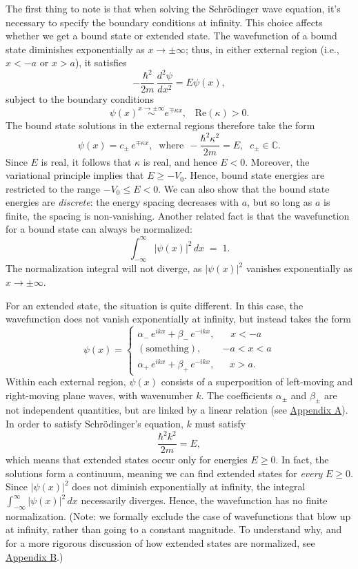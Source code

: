 \documentclass[pra,12pt]{revtex4}
\begin{document}
The first thing to note is that when solving the Schr\"odinger wave
equation, it's necessary to specify the boundary conditions at
infinity.  This choice affects whether we get a bound state or
extended state.  The wavefunction of a bound state diminishes
exponentially as $x \rightarrow \pm\infty$; thus, in either external
region (i.e., $x < -a$ or $x > a$), it satisfies
$$-\frac{\hbar^2}{2m}\,\frac{d^2\psi}{dx^2} = E \psi(x),$$
subject to the boundary conditions
$$\psi(x) \overset{x\rightarrow\pm\infty}{\sim} e^{\mp\kappa x}, \;\;\;\mathrm{Re}(\kappa) > 0.$$
The bound state solutions in the external regions therefore take the
form
$$\psi(x) = c_\pm\, e^{\mp\kappa x}, \;\;\mathrm{where}\;\, -\frac{\hbar^2\kappa^2}{2m} = E, \;\; c_\pm \in \mathbb{C}.$$
Since $E$ is real, it follows that $\kappa$ is real, and hence $E <
0$.  Moreover, the variational principle implies that $E \ge -V_0$.
Hence, bound state energies are restricted to the range $-V_0 \le E <
0$.  We can also show that the bound state energies are
\textit{discrete}: the energy spacing decreases with $a$, but so long
as $a$ is finite, the spacing is non-vanishing.  Another related
fact is that the wavefunction for a bound state can always be
normalized:
$$\int_{-\infty}^\infty |\psi(x)|^2\, dx\; =\; 1.$$
The normalization integral will not diverge, as $|\psi(x)|^2$ vanishes
exponentially as $x \rightarrow \pm \infty$.

For an extended state, the situation is quite different.  In this
case, the wavefunction does not vanish exponentially at infinity, but
instead takes the form
$$\psi(x) = \begin{cases} \alpha_-\, e^{ik x} + \beta_-\, e^{-ik x}, & \;\;\;x < -a\\ (\mathrm{something}) , & -a < x < a\\ \alpha_+\, e^{ik x} + \beta_+\, e^{-ik x} , & \;\;\,x > a.\end{cases}$$
Within each external region, $\psi(x)$ consists of a superposition of
left-moving and right-moving plane waves, with wavenumber $k$.  The
coefficients $\alpha_\pm$ and $\beta_\pm$ are not independent
quantities, but are linked by a linear relation (see
\hyperref[sec:appendix]{Appendix A}).  In order to satisfy
Schr\"odinger's equation, $k$ must satisfy
$$\frac{\hbar^2k^2}{2m} = E,$$
which means that extended states occur only for energies $E \ge 0$.
In fact, the solutions form a continuum, meaning we can find extended
states for \textit{every} $E \ge 0$.  Since $|\psi(x)|^2$ does not
diminish exponentially at infinity, the integral $\int_{-\infty}^\infty
|\psi(x)|^2\, dx$ necessarily diverges.  Hence, the wavefunction
has no finite normalization.  (Note: we formally exclude the case of
wavefunctions that blow up at infinity, rather than going to a
constant magnitude.  To understand why, and for a more rigorous
discussion of how extended states are normalized, see
\hyperref[sec:normalization]{Appendix B}.)
\end{document}

